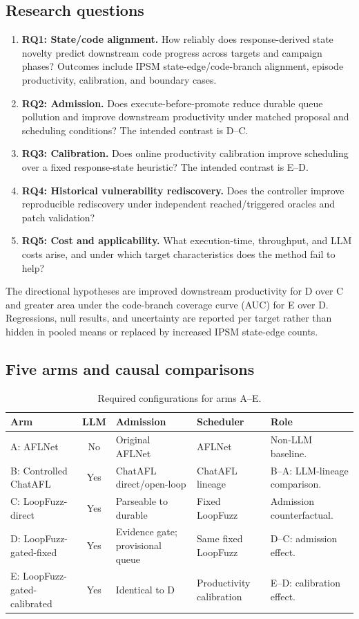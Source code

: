 \documentclass[final,5p,times,number]{elsarticle}
\begin{document}
\subsection{Research questions}
\begin{enumerate}
\item \textbf{RQ1: State/code alignment.} How reliably does response-derived state novelty predict downstream code progress across targets and campaign phases? Outcomes include IPSM state-edge/code-branch alignment, episode productivity, calibration, and boundary cases.
\item \textbf{RQ2: Admission.} Does execute-before-promote reduce durable queue pollution and improve downstream productivity under matched proposal and scheduling conditions? The intended contrast is D--C.
\item \textbf{RQ3: Calibration.} Does online productivity calibration improve scheduling over a fixed response-state heuristic? The intended contrast is E--D.
\item \textbf{RQ4: Historical vulnerability rediscovery.} Does the controller improve reproducible rediscovery under independent reached/triggered oracles and patch validation?
\item \textbf{RQ5: Cost and applicability.} What execution-time, throughput, and LLM costs arise, and under which target characteristics does the method fail to help?
\end{enumerate}
The directional hypotheses are improved downstream productivity for D over C and greater area under the code-branch coverage curve (AUC) for E over D. Regressions, null results, and uncertainty are reported per target rather than hidden in pooled means or replaced by increased IPSM state-edge counts.

\subsection{Five arms and causal comparisons}
\begin{table}[!tbp]
\centering\small
\caption{Required configurations for arms A--E.}
\label{tab:arms}
\begin{tabularx}{\textwidth}{l c Y Y Y}
\toprule
Arm & LLM & Admission & Scheduler & Role \\
\midrule
A: AFLNet & No & Original AFLNet & AFLNet & Non-LLM baseline. \\
B: Controlled ChatAFL & Yes & ChatAFL direct/open-loop & ChatAFL lineage & B--A: LLM-lineage comparison. \\
C: LoopFuzz-direct & Yes & Parseable to durable & Fixed LoopFuzz & Admission counterfactual. \\
D: LoopFuzz-gated-fixed & Yes & Evidence gate; provisional queue & Same fixed LoopFuzz & D--C: admission effect. \\
E: LoopFuzz-gated-calibrated & Yes & Identical to D & Productivity calibration & E--D: calibration effect. \\
\bottomrule
\end{tabularx}
\end{table}
\end{document}
